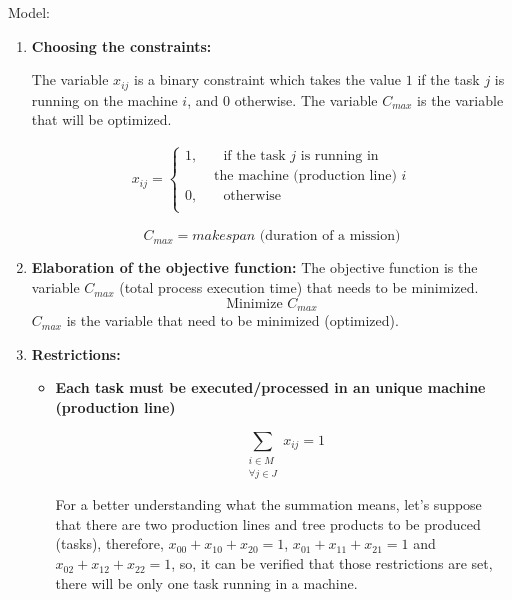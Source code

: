 \documentclass[conference,harvard,brazil,english]{sbatex}
\begin{document}
Model:

\begin{enumerate}
\item \textbf{Choosing the constraints:}

The variable $x_ {ij}$ is a binary constraint which takes the value $1$ if the task $j$ is running on the machine $i$, and $0$ otherwise. The variable $C_ {max}$ is the variable that will be optimized.

\begin{equation}
\begin{split}
x_{ij}=\begin{cases}
    1,       & \quad \text{if the task } j \text{ is running in} \\
 &\text{ the machine (production line) }i\\
    0,  & \quad \text{otherwise}\\
  \end{cases}
\end{split}
\end{equation}

\begin{equation}
C_{max}=makespan \text{ (duration of a mission)}
\end{equation}
\item \textbf{Elaboration of the objective function:}
The objective function is the variable $C_ {max}$ (total process execution time) that needs to be minimized.
\begin{equation}
\text{Minimize } C_{max}
\end{equation}
$C_{max}$ is the variable that need to be minimized (optimized).
\item \textbf{Restrictions:}

\begin{itemize}
\item \textbf{Each task must be executed/processed in an unique machine (production line)}

\begin{equation}
\sum_{\substack{
   i \in M\\
   \forall j \in J
  }} 
 x_{ij}=1
\end{equation}

For a better understanding what the summation means, let's suppose that there are two production lines and tree products to be produced (tasks), therefore, $x_{00}+x_{10}+x_{20}=1$, $x_{01}+x_{11}+x_{21}=1$ and $x_{02}+x_{12}+x_{22}=1$, so, it can be verified that those restrictions are set, there will be only one task running in a machine.


\end{itemize}
\end{enumerate}
\end{document}
